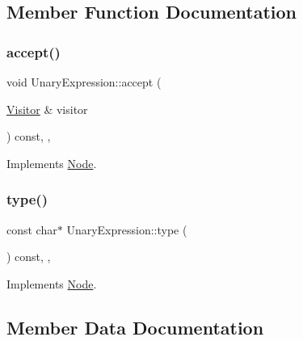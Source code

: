 \subsection{Member Function Documentation}
\mbox{\label{struct_unary_expression_a88c89a0268ecfa5008b5afe7bc47913a}} 
\subsubsection{\texorpdfstring{accept()}{accept()}}
{\footnotesize\ttfamily void Unary\+Expression\+::accept (\begin{DoxyParamCaption}\item[{\hyperlink{struct_visitor}{Visitor} \&}]{visitor }\end{DoxyParamCaption}) const\hspace{0.3cm}{\ttfamily [inline]}, {\ttfamily [override]}, {\ttfamily [virtual]}}



Implements \hyperlink{struct_node_a10bd7af968140bbf5fa461298a969c71}{Node}.

\mbox{\label{struct_unary_expression_ae98f7830a67f58e467de4bae7af035ab}} 
\subsubsection{\texorpdfstring{type()}{type()}}
{\footnotesize\ttfamily const char$\ast$ Unary\+Expression\+::type (\begin{DoxyParamCaption}{ }\end{DoxyParamCaption}) const\hspace{0.3cm}{\ttfamily [inline]}, {\ttfamily [override]}, {\ttfamily [virtual]}}



Implements \hyperlink{struct_node_a82f29420d0a38efcc370352528e94e9b}{Node}.



\subsection{Member Data Documentation}
\mbox{\label{struct_unary_expression_a057cfd54844d5b36e15f16ee5272b071}} 
